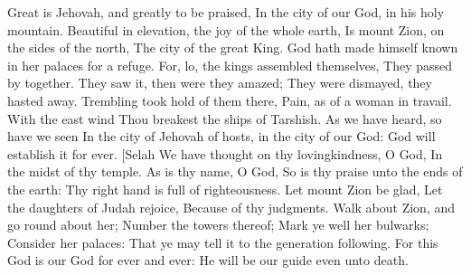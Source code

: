 Great is Jehovah, and greatly to be praised, In the city of our God, in his holy mountain.  Beautiful in elevation, the joy of the whole earth, Is mount Zion, on the sides of the north, The city of the great King.  God hath made himself known in her palaces for a refuge.  For, lo, the kings assembled themselves, They passed by together.  They saw it, then were they amazed; They were dismayed, they hasted away.  Trembling took hold of them there, Pain, as of a woman in travail.  With the east wind Thou breakest the ships of Tarshish.  As we have heard, so have we seen In the city of Jehovah of hosts, in the city of our God: God will establish it for ever. [Selah  We have thought on thy lovingkindness, O God, In the midst of thy temple.  As is thy name, O God, So is thy praise unto the ends of the earth: Thy right hand is full of righteousness.  Let mount Zion be glad, Let the daughters of Judah rejoice, Because of thy judgments.  Walk about Zion, and go round about her; Number the towers thereof;  Mark ye well her bulwarks; Consider her palaces: That ye may tell it to the generation following.  For this God is our God for ever and ever: He will be our guide even unto death. 

